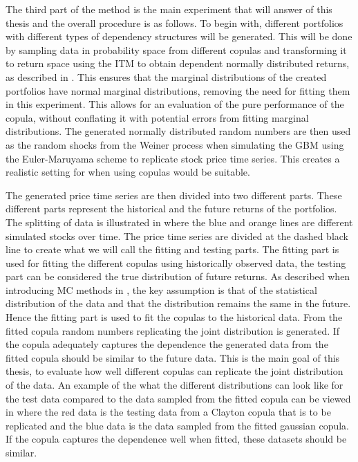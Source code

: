 The third part of the method is the main experiment that will answer \RQthree  of this thesis and the overall procedure is as follows. To begin with, different portfolios with different types of dependency structures will be generated. This will be done by sampling data in probability space from different copulas and transforming it to return space using the \gls{ITM} to obtain dependent normally distributed returns, as described in . This ensures that the marginal distributions of the created portfolios have normal marginal distributions, removing the need for fitting them in this experiment. This allows for an evaluation of the pure performance of the copula, without conflating it with potential errors from fitting marginal distributions. The generated normally distributed random numbers are then used as the random shocks from the Weiner process when simulating the \gls{GBM} using the Euler-Maruyama scheme to replicate stock price time series. This creates a realistic setting for when using copulas would be suitable.  

The generated price time series are then divided into two different parts. These different parts represent the historical and the future returns of the portfolios. The splitting of data is illustrated in  where the blue and orange lines are different simulated stocks over time. The price time series are divided at the dashed black line to create what we will call the fitting and testing parts. The fitting part is used for fitting the different copulas using historically observed data, the testing part can be considered the true distribution of future returns. As described when introducing \gls{MC} methods in , the key assumption is that of the statistical distribution of the data and that the distribution remains the same in the future. Hence the fitting part is used to fit the copulas to the historical data. From the fitted copula random numbers replicating the joint distribution is generated. If the copula adequately captures the dependence the generated data from the fitted copula should be similar to the future data. This is the main goal of this thesis, to evaluate how well different copulas can replicate the joint distribution of the data. An example of the what the different distributions can look like for the test data compared to the data sampled from the fitted copula can be viewed in  where the red data is the testing data from a Clayton copula that is to be replicated and the blue data is the data sampled from the fitted gaussian copula. If the copula captures the dependence well when fitted, these datasets should be similar. 

